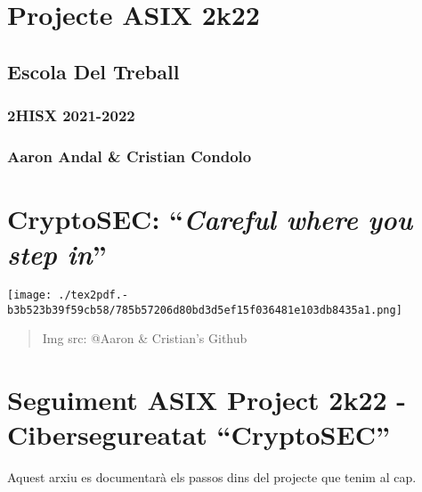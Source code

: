 \documentclass[]{article}
\date{}
\begin{document}
\hypertarget{projecte-asix-2k22}{%
\section{\texorpdfstring{\textbf{Projecte ASIX
2k22}}{Projecte ASIX 2k22}}\label{projecte-asix-2k22}}

\hypertarget{escola-del-treball}{%
\subsection{\texorpdfstring{\textbf{Escola Del
Treball}}{Escola Del Treball}}\label{escola-del-treball}}

\hypertarget{hisx-2021-2022}{%
\subsubsection{\texorpdfstring{\textbf{2HISX
2021-2022}}{2HISX 2021-2022}}\label{hisx-2021-2022}}

\hypertarget{aaron-andal-cristian-condolo}{%
\subsubsection{\texorpdfstring{\textbf{Aaron Andal \& Cristian
Condolo}}{Aaron Andal \& Cristian Condolo}}\label{aaron-andal-cristian-condolo}}

\hypertarget{cryptosec-careful-where-you-step-in}{%
\section{\texorpdfstring{\textbf{CryptoSEC}: ``\emph{Careful where you
step
in}''}{CryptoSEC: ``Careful where you step in''}}\label{cryptosec-careful-where-you-step-in}}

\texttt{[image: ./tex2pdf.-b3b523b39f59cb58/785b57206d80bd3d5ef15f036481e103db8435a1.png]}

\begin{quote}
Img src: @Aaron \& Cristian's Github
\end{quote}

\hypertarget{seguiment-asix-project-2k22---cibersegureatat-cryptosec}{%
\section{Seguiment ASIX Project 2k22 - Cibersegureatat
``CryptoSEC''}\label{seguiment-asix-project-2k22---cibersegureatat-cryptosec}}

Aquest arxiu es documentarà els passos dins del projecte que tenim al
cap.
\end{document}
